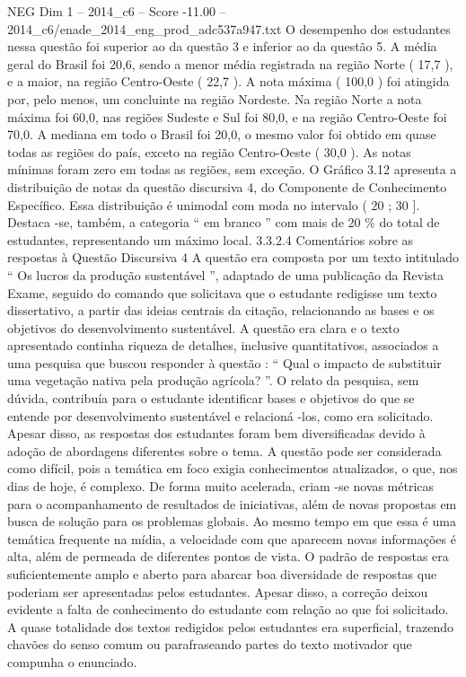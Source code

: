 \begin{textsample}{NEG Dim 1 – 2014\_c6 – Score -11.00 – 2014\_c6/enade\_2014\_eng\_prod\_adc537a947.txt}
O desempenho dos estudantes nessa questão foi superior ao da questão 3 e inferior ao da questão 5.
A média geral do Brasil foi 20,6, sendo a menor média registrada na região Norte ( 17,7 ), e a maior, na região Centro-Oeste ( 22,7 ).
A nota máxima ( 100,0 ) foi atingida por, pelo menos, um concluinte na região Nordeste.
Na região Norte a nota máxima foi 60,0, nas regiões Sudeste e Sul foi 80,0, e na região Centro-Oeste foi 70,0.
A mediana em todo o Brasil foi 20,0, o mesmo valor foi obtido em quase todas as regiões do país, exceto na região Centro-Oeste ( 30,0 ).
As notas mínimas foram zero em todas as regiões, sem exceção.
O Gráfico 3.12 apresenta a distribuição de notas da questão discursiva 4, do Componente de Conhecimento Específico.
Essa distribuição é unimodal com moda no intervalo ( 20 ; 30 ].
Destaca -se, também, a categoria “ em branco ” com mais de 20 \% do total de estudantes, representando um máximo local. 3.3.2.4 Comentários sobre as respostas à Questão Discursiva 4 A questão era composta por um texto intitulado “ Os lucros da produção sustentável ”, adaptado de uma publicação da Revista Exame, seguido do comando que solicitava que o estudante redigisse um texto dissertativo, a partir das ideias centrais da citação, relacionando as bases e os objetivos do desenvolvimento sustentável.
A questão era clara e o texto apresentado continha riqueza de detalhes, inclusive quantitativos, associados a uma pesquisa que buscou responder à questão : “ Qual o impacto de substituir uma vegetação nativa pela produção agrícola? ”.
O relato da pesquisa, sem dúvida, contribuía para o estudante identificar bases e objetivos do que se entende por desenvolvimento sustentável e relacioná -los, como era solicitado.
Apesar disso, as respostas dos estudantes foram bem diversificadas devido à adoção de abordagens diferentes sobre o tema.
A questão pode ser considerada como difícil, pois a temática em foco exigia conhecimentos atualizados, o que, nos dias de hoje, é complexo.
De forma muito acelerada, criam -se novas métricas para o acompanhamento de resultados de iniciativas, além de novas propostas em busca de solução para os problemas globais.
Ao mesmo tempo em que essa é uma temática frequente na mídia, a velocidade com que aparecem novas informações é alta, além de permeada de diferentes pontos de vista.
O padrão de respostas era suficientemente amplo e aberto para abarcar boa diversidade de respostas que poderiam ser apresentadas pelos estudantes.
Apesar disso, a correção deixou evidente a falta de conhecimento do estudante com relação ao que foi solicitado.
A quase totalidade dos textos redigidos pelos estudantes era superficial, trazendo chavões do senso comum ou parafraseando partes do texto motivador que compunha o enunciado.

\end{textsample}
